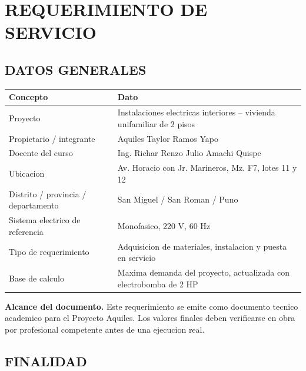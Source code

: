\documentclass[12pt,letterpaper]{report}
\newcommand{\reqnote}[1]{%
  \begingroup
  \setlength{\fboxsep}{8pt}%
  \colorbox{modelblue!8}{%
    \begin{minipage}{0.94\textwidth}
      #1
    \end{minipage}%
  }%
  \endgroup
}
\newcommand{\reqheader}{\rowcolor{modelblue!14}}
\begin{document}
\hypersetup{pageanchor=false}

\clearpage
\hypersetup{pageanchor=true}

\pagestyle{memoria}
\renewcommand{\documentfootertext}{REQUERIMIENTO DE SERVICIO - INSTALACIONES ELECTRICAS}

\tableofcontents
\clearpage

\chapter*{REQUERIMIENTO DE SERVICIO}

\section{DATOS GENERALES}

\begin{table}[H]
\centering
\renewcommand{\arraystretch}{1.18}
\begin{tabularx}{\textwidth}{P{0.34\textwidth} L}
\toprule
\reqheader \textbf{Concepto} & \textbf{Dato} \\
\midrule
Proyecto & Instalaciones electricas interiores -- vivienda unifamiliar de 2 pisos \\
Propietario / integrante & Aquiles Taylor Ramos Yapo \\
Docente del curso & Ing. Richar Renzo Julio Amachi Quispe \\
Ubicacion & Av. Horacio con Jr. Marineros, Mz. F7, lotes 11 y 12 \\
Distrito / provincia / departamento & San Miguel / San Roman / Puno \\
Sistema electrico de referencia & Monofasico, 220 V, 60 Hz \\
Tipo de requerimiento & Adquisicion de materiales, instalacion y puesta en servicio \\
Base de calculo & Maxima demanda del proyecto, actualizada con electrobomba de 2 HP \\
\bottomrule
\end{tabularx}
\end{table}

\reqnote{%
\textbf{Alcance del documento.} Este requerimiento se emite como documento tecnico academico para el Proyecto Aquiles. Los valores finales deben verificarse en obra por profesional competente antes de una ejecucion real.%
}

\section{FINALIDAD}
\end{document}
